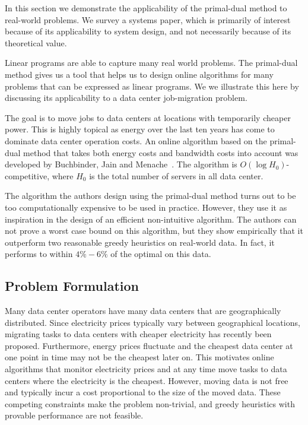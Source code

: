 In this section we demonstrate the applicability of the primal-dual method to real-world problems.
We survey a systems paper, which is primarily of interest because of its applicability to system design, and not necessarily because of its theoretical value.

Linear programs are able to capture many real world problems. The primal-dual method gives us a tool that helps us to design online algorithms for many problems that can be expressed as linear programs.
We we illustrate this here by discussing its applicability to a data center job-migration problem.

The goal is to move jobs to data centers at locations with temporarily cheaper power.
This is highly topical as energy over the last ten years has come to dominate data center operation costs.
An online algorithm based on the primal-dual method that takes both energy costs and bandwidth costs into account was developed by Buchbinder, Jain and Menache~\cite{buchbinder11:job-migration,buchbinder11:job-migration-techreport}.
The algorithm is $O(\log H_0)$-competitive, where $H_0$ is the total number of servers in all data center.

The algorithm the authors design using the primal-dual method turns out to be too computationally expensive to be used in practice.
However, they use it as inspiration in the design of an efficient non-intuitive algorithm.
The authors can not prove a worst case bound on this algorithm, but they show empirically that it outperform two reasonable greedy heuristics on real-world data.
In fact, it performs to within $4\%-6\%$ of the optimal on this data.

\subsection{Problem Formulation}

Many data center operators have many data centers that are geographically distributed.
Since electricity prices typically vary between geographical locations, migrating tasks to data centers with cheaper electricity has recently been proposed.
Furthermore, energy prices fluctuate and the cheapest data center at one point in time may not be the cheapest later on.
This motivates online algorithms that monitor electricity prices and at any time move tasks to data centers where the electricity is the cheapest.
However, moving data is not free and typically incur a cost proportional to the size of the moved data.
These competing constraints make the problem non-trivial, and greedy heuristics with provable performance are not feasible.

